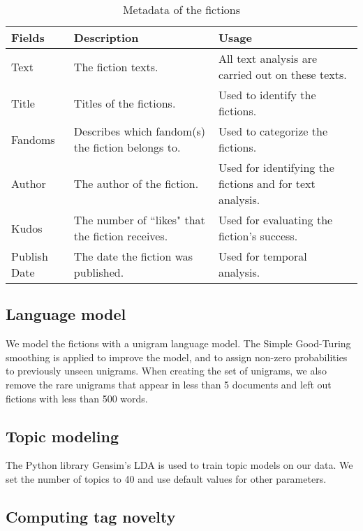 \documentclass[a4paper]{article}
\begin{document}
\begin{table}[htp]
\caption{Metadata of the fictions}
\begin{center}
\begin{tabular}[width=0.8\textwidth]{p{2cm}|p{4cm}|p{5cm}}
  \hline			
 Fields & Description & Usage\\ 
   \hline			
Text & The fiction texts. & All text analysis are carried out on these texts.\\\hline
Title & Titles of the fictions. & Used to identify the fictions. \\\hline
Fandoms & Describes which fandom(s) the fiction belongs to. & Used to categorize the fictions.\\\hline
Author & The author of the fiction. & Used for identifying the fictions and for text analysis. \\\hline
Kudos & The number of ``likes" that the fiction receives. &  Used for evaluating the fiction's success.\\\hline
Publish Date & The date the fiction was published. & Used for temporal analysis.\\\hline

\hline
\end{tabular}
\end{center}
\label{tab:metadata}
\end{table}%

\subsection*{Language model}
We model the fictions with a unigram language model. The Simple Good-Turing smoothing\cite{gales1995good} is applied to improve the model, and to assign non-zero probabilities to previously unseen unigrams. When creating the set of unigrams, we also remove the rare unigrams that appear in less than 5 documents and left out fictions with less than 500 words.


\subsection*{Topic modeling}
The Python library Gensim's LDA \cite{gensimlda} is used to train topic models on our data. We set the number of topics to 40 and use default values for other parameters. 
\subsection*{Computing tag novelty}








    
\end{document}
